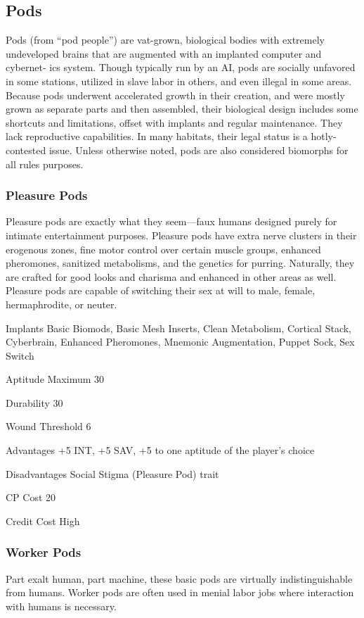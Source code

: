 \subsection{Pods}
Pods (from “pod people”) are vat-grown, biological bodies with extremely
undeveloped brains that are augmented with an implanted computer and cybernet-
ics system. Though typically run by an AI, pods are socially unfavored in some
stations, utilized in slave labor in others, and even illegal in some
areas. Because pods underwent accelerated growth in their creation, and were
mostly grown as separate parts and then assembled, their biological design
includes some shortcuts and limitations, offset with implants and regular
maintenance. They lack reproductive capabilities. In many habitats, their legal
status is a hotly-contested issue.  Unless otherwise noted, pods are also
considered biomorphs for all rules purposes.

\subsubsection{Pleasure Pods}
Pleasure pods are exactly what they seem—faux humans designed purely for
intimate entertainment purposes. Pleasure pods have extra nerve clusters in
their erogenous zones, fine motor control over certain muscle groups, enhanced
pheromones, sanitized metabolisms, and the genetics for purring. Naturally,
they are crafted for good looks and charisma and enhanced in other areas as
well. Pleasure pods are capable of switching their sex at will to male, female,
hermaphrodite, or neuter.

\begin{description*}
\item[Implants] Basic Biomods, Basic Mesh Inserts, Clean Metabolism, Cortical
  Stack, Cyberbrain, Enhanced Pheromones, Mnemonic Augmentation, Puppet Sock,
  Sex Switch
\item[Aptitude Maximum] 30 
\item[Durability] 30 
\item[Wound Threshold] 6 
\item[Advantages] +5 INT, +5 SAV, +5 to one aptitude of the player’s choice 
\item[Disadvantages] Social Stigma (Pleasure Pod) trait 
\item[CP Cost] 20 
\item[Credit Cost] High 
\end{description*}

\subsubsection{Worker Pods}
Part exalt human, part machine, these basic pods are virtually
indistinguishable from humans. Worker pods are often used in menial labor jobs
where interaction with humans is necessary.

